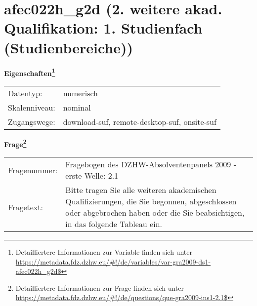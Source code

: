
    \setcounter{footnote}{0}

    \vspace*{-1.8cm}
	\section{afec022h\_g2d (2. weitere akad. Qualifikation: 1. Studienfach (Studienbereiche))}
	\label{section:afec022h_g2d}



    \vspace*{0.5cm}
    \noindent\textbf{Eigenschaften\footnote{Detailliertere Informationen zur Variable finden sich unter
		\url{https://metadata.fdz.dzhw.eu/\#!/de/variables/var-gra2009-ds1-afec022h_g2d$}}}\\
	\begin{tabularx}{\hsize}{@{}lX}
	Datentyp: & numerisch \\
	Skalenniveau: & nominal \\
	Zugangswege: &
	  download-suf, 
	  remote-desktop-suf, 
	  onsite-suf
 \\
    \end{tabularx}



				\vspace*{0.5cm}
                \noindent\textbf{Frage\footnote{Detailliertere Informationen zur Frage finden sich unter
		              \url{https://metadata.fdz.dzhw.eu/\#!/de/questions/que-gra2009-ins1-2.1$}}}\\
				\begin{tabularx}{\hsize}{@{}lX}
					Fragenummer: &
					  Fragebogen des DZHW-Absolventenpanels 2009 - erste Welle:
					  2.1
 \\
					Fragetext: & Bitte tragen Sie alle weiteren akademischen Qualifizierungen, die Sie begonnen, abgeschlossen oder abgebrochen haben oder die Sie beabsichtigen, in das folgende Tableau ein. \\
				\end{tabularx}





